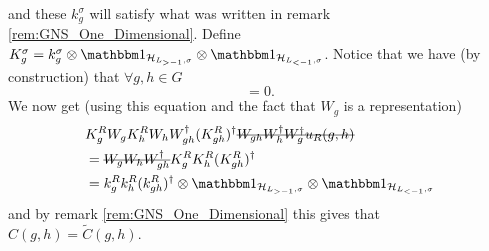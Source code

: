 \documentclass[11pt,a4paper,twoside]{article}
\numberwithin{equation}{section}
\begin{document}
	and these $k^\sigma_g$ will satisfy what was written in remark \ref{rem:GNS_One_Dimensional}. Define $K^\sigma_g=k^\sigma_g\otimes\id_{\HH_{L_{>-1},\sigma}}\otimes\id_{\HH_{L_{<-1},\sigma}}$. Notice that we have (by construction) that $\forall g,h\in G$
	\begin{equation}
		[K^\sigma_g\otimes\id_{\HH_{\ZZ^2/\sigma}},W_h]=0.
	\end{equation}
	We now get (using this equation and the fact that $W_g$ is a representation)
	\begin{align}
		&K_g^R W_g K_h^R W_h W_{gh}^\dagger (K_{gh}^R)^\dagger \stkout{W_{gh}W_h^\dagger W_g^\dagger u_R(g,h)}\\
		&=\stkout{W_g W_h W_{gh}^\dagger} K_g^R K_h^R (K_{gh}^R)^\dagger\\
		&=k_g^R k_h^R (k_{gh}^R)^\dagger\otimes \id_{\HH_{L_{>-1},\sigma}}\otimes\id_{\HH_{L_{<-1},\sigma}}
	\end{align}
	and by remark \ref{rem:GNS_One_Dimensional} this gives that $C(g,h)=\tilde{C}(g,h)$.
\end{document}
